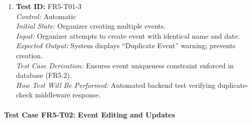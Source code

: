 \documentclass[12pt, titlepage]{article}
\begin{document}
\begin{enumerate}
    \item \textbf{Test ID:} FR5-T01-3\\[0.5em]
    \textit{Control:} Automatic\\[0.3em]
    \textit{Initial State:} Organizer creating multiple events.\\[0.3em]
    \textit{Input:} Organizer attempts to create event with identical name and date.\\[0.3em]
    \textit{Expected Output:} System displays “Duplicate Event” warning; prevents creation.\\[0.3em]
    \textit{Test Case Derivation:} Ensures event uniqueness constraint enforced in database (FR5.2).\\[0.3em]
    \textit{How Test Will Be Performed:} Automated backend test verifying duplicate-check middleware response.
\end{enumerate}

\paragraph{Test Case FR5-T02: Event Editing and Updates}
\end{document}
